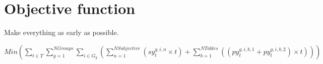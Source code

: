 \documentclass[letterpaper,11pt]{report}
\begin{document}
\section{Objective function}
Make everything as early as possible.

$Min ( 
\sum\limits_{t \in T}
 \sum\limits_{g=1}^{NGroups}
  \sum\limits_{i \in G_{g}} (
    \sum\limits_{n=1}^{NSubjective}
      ( sy_{t}^{g,i,n} \times t )
  + \sum\limits_{b=1}^{NTables} ( ( py_{t}^{g,i,b,1} + py_{t}^{g,i,b,2} )
  \times t)
  )
) $
\end{document}
